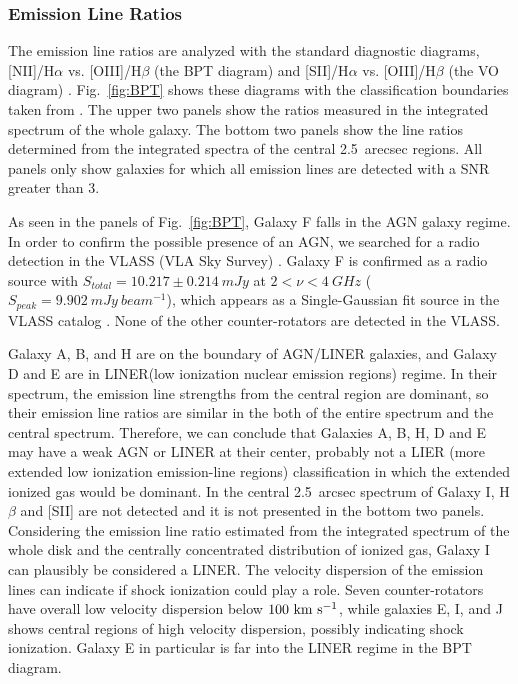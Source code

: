 \documentclass[fleqn,usenatbib]{mnras}
\begin{document}
\subsubsection{Emission Line Ratios} 
\label{sec:emission_line_ratio}


The emission line ratios are analyzed with the standard diagnostic diagrams,
[NII]/H$\alpha$ vs. [OIII]/H$\beta$ (the BPT diagram) and 
[SII]/H$\alpha$ vs. [OIII]/H$\beta$ (the VO diagram)
\citep{BPTdiagram,VOdiagram}.
Fig.~\ref{fig:BPT} shows these diagrams with 
the classification boundaries taken from \citet{BPTlines}. 
The upper two panels show the ratios 
measured in the integrated spectrum of
the whole galaxy.
The bottom two panels show the line ratios
determined from the integrated spectra of 
the central 2.5~arecsec regions.
All panels only show galaxies for which all emission lines are detected 
with a SNR greater than 3.

As seen in the panels of Fig.~\ref{fig:BPT},
Galaxy F falls in the AGN galaxy regime.
In order to confirm the possible presence of an AGN,
we searched for a radio detection in the VLASS (VLA Sky Survey)
\citep{VLASS}.
Galaxy F is confirmed as a radio source 
with $S_{total} = 10.217 \pm 0.214~mJy$
at $2 < \nu < 4~GHz$ ($S_{peak}=9.902~mJy~beam^{-1}$), 
which appears as a Single-Gaussian fit source 
in the VLASS catalog \citep{VALSSquick}.
None of the other counter-rotators are detected in the VLASS.

Galaxy A, B, and H  are on the boundary of AGN/LINER galaxies,
and Galaxy D and E are in LINER(low ionization nuclear emission regions) regime. In their spectrum, 
the emission line strengths from the central region are dominant,
so their emission line ratios are similar in the both of 
the entire spectrum and the central spectrum. 
Therefore, we can conclude 
that Galaxies A, B, H, D and E may have a weak AGN or LINER at their center,
probably not a LIER (more extended low ionization emission-line regions) 
classification in which the extended ionized gas would be dominant.
In the central 2.5~arcsec spectrum of Galaxy I,
H$\beta$ and [SII] are not detected and it is not presented in the bottom two panels. 
Considering the emission line ratio estimated 
from the integrated spectrum of the whole disk
and the centrally concentrated distribution of ionized gas,
Galaxy I can plausibly be considered a LINER.
The velocity dispersion of the emission lines can indicate if shock ionization could play a role. 
Seven counter-rotators have overall low velocity dispersion below $\rm 100~km~s^{-1}$, while galaxies E, I, and J shows central regions of high velocity dispersion, possibly indicating shock ionization. Galaxy E in particular is far into the LINER regime in the BPT diagram.
\end{document}
